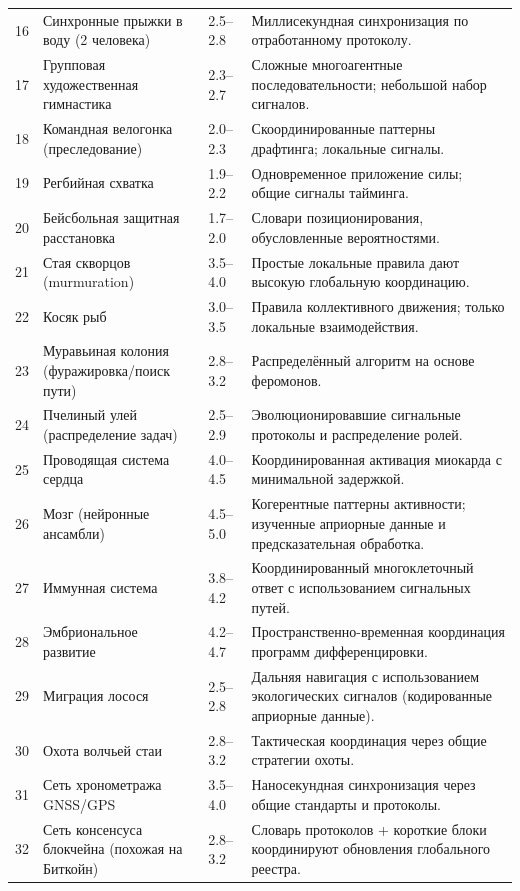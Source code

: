 \documentclass[11pt,a4paper]{article}
\begin{document}
\begin{longtable}{|p{0.8cm}|p{6.2cm}|p{3.0cm}|p{5.7cm}|}
		16 & Синхронные прыжки в воду (2 человека) & 2.5--2.8 & Миллисекундная синхронизация по отработанному протоколу. \\
		17 & Групповая художественная гимнастика & 2.3--2.7 & Сложные многоагентные последовательности; небольшой набор сигналов. \\
		18 & Командная велогонка (преследование) & 2.0--2.3 & Скоординированные паттерны драфтинга; локальные сигналы. \\
		19 & Регбийная схватка & 1.9--2.2 & Одновременное приложение силы; общие сигналы тайминга. \\
		20 & Бейсбольная защитная расстановка & 1.7--2.0 & Словари позиционирования, обусловленные вероятностями. \\
		21 & Стая скворцов (murmuration) & 3.5--4.0 & Простые локальные правила дают высокую глобальную координацию. \\
		22 & Косяк рыб & 3.0--3.5 & Правила коллективного движения; только локальные взаимодействия. \\
		23 & Муравьиная колония (фуражировка/поиск пути) & 2.8--3.2 & Распределённый алгоритм на основе феромонов. \\
		24 & Пчелиный улей (распределение задач) & 2.5--2.9 & Эволюционировавшие сигнальные протоколы и распределение ролей. \\
		25 & Проводящая система сердца & 4.0--4.5 & Координированная активация миокарда с минимальной задержкой. \\
		26 & Мозг (нейронные ансамбли) & 4.5--5.0 & Когерентные паттерны активности; изученные априорные данные и предсказательная обработка. \\
		27 & Иммунная система & 3.8--4.2 & Координированный многоклеточный ответ с использованием сигнальных путей. \\
		28 & Эмбриональное развитие & 4.2--4.7 & Пространственно-временная координация программ дифференцировки. \\
		29 & Миграция лосося & 2.5--2.8 & Дальняя навигация с использованием экологических сигналов (кодированные априорные данные). \\
		30 & Охота волчьей стаи & 2.8--3.2 & Тактическая координация через общие стратегии охоты. \\
		31 & Сеть хронометража GNSS/GPS & 3.5--4.0 & Наносекундная синхронизация через общие стандарты и протоколы. \\
		32 & Сеть консенсуса блокчейна (похожая на Биткойн) & 2.8--3.2 & Словарь протоколов + короткие блоки координируют обновления глобального реестра. \\

\end{longtable}
\end{document}

